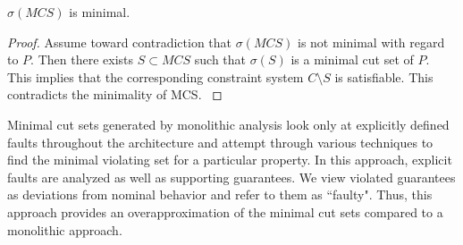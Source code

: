 \begin{lemma} $\sigma(MCS)$ is minimal.
\begin{proof}
Assume toward contradiction that $\sigma(MCS)$ is not minimal with regard to $P$. Then there exists $S \subset MCS$ such that $\sigma(S)$ is a minimal cut set of $P$. This implies that the corresponding constraint system $C \setminus S$ is satisfiable. This contradicts the minimality of MCS.
\label{lemma:min}
\end{proof}
\end{lemma}

Minimal cut sets generated by monolithic analysis look only at explicitly defined faults throughout the architecture and attempt through various techniques to find the minimal violating set for a particular property. In this approach, explicit faults are analyzed as well as supporting guarantees. We view violated guarantees as deviations from nominal behavior and refer to them as ``faulty". Thus, this approach provides an overapproximation of the minimal cut sets compared to a monolithic approach. %


